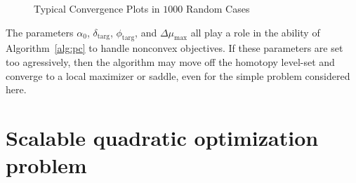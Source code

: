 \begin{figure}[tbp]
   \centering
     \hspace{1em}
    \caption{Typical Convergence Plots in $1000$ Random Cases \label{fig:nc_converg}}
\end{figure}

\begin{remark}
  The parameters $\alpha_0$, $\delta_{\text{targ}}$, $\phi_{\text{targ}}$, and
  $\Delta \mu_{\max}$ all play a role in the ability of Algorithm~\ref{alg:pc}
  to handle nonconvex objectives.  If these parameters are set too agressively,
  then the algorithm may move off the homotopy level-set and converge to a local
  maximizer or saddle, even for the simple problem considered here.
\end{remark}

\section{Scalable quadratic optimization problem}


